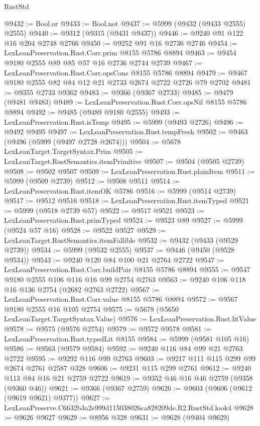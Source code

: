 \begin{lexlean}{RustStd}
\begin{coremodule}
@9432 := Bool.or
@9433 := Bool.not
@9437 := @5999 (@9432 (@9433 @2555) @2555)
@9440 := @9312 (@9315 (@9431 @9437))
@9446 := @9240 @91 @122 @16 @204 @2748 @2766
@9450 := @9252 @91 @16 @2736 @2746
@9454 := LexLeanPreservation.Rust.Corr.prim @8155 @5786 @8894
@9463 := @9454 @9180 @2555 @89 @85 @57 @16 @2736 @2744 @2739
@9467 := LexLeanPreservation.Rust.Corr.opsCons @8155 @5786 @8894
@9479 := @9467 @9180 @2555 @82 @84 @12 @21 @2733 @2674 @2722 @2726 @79 @2702
@9481 := @9355 @2733 @9362
@9483 := @9366 (@9367 @2733)
@9485 := @9479 (@9481 @9483)
@9489 := LexLeanPreservation.Rust.Corr.opsNil @8155 @5786 @8894
@9492 := @9485 (@9489 @9180 @2555)
@9493 := LexLeanPreservation.Rust.isTemp
@9495 := @5999 (@9493 @2726)
@9496 := @9492 @9495
@9497 := LexLeanPreservation.Rust.tempFresh
@9502 := @9463 (@9496 (@5999 (@9497 @2728 @2674)))
@9504 := @5678 LexLeanTarget.TargetSyntax.Prim
@9505 := LexLeanTarget.RustSemantics.itemPrimitive
@9507 := @9504 (@9505 @2739)
@9508 := @9502 @9507
@9509 := LexLeanPreservation.Rust.plainItem
@9511 := @5999 (@9509 @2739)
@9512 := @9508 @9511
@9514 := LexLeanPreservation.Rust.itemOK @5786
@9516 := @5999 (@9514 @2739)
@9517 := @9512 @9516
@9518 := LexLeanPreservation.Rust.itemTyped
@9521 := @5999 (@9518 @2739 @57)
@9522 := @9517 @9521
@9523 := LexLeanPreservation.Rust.primTyped
@9524 := @9523 @89
@9527 := @5999 (@9524 @57 @16)
@9528 := @9522 @9527
@9529 := LexLeanTarget.RustSemantics.itemFallible
@9532 := @9432 (@9433 (@9529 @2739))
@9534 := @5999 (@9532 @2555)
@9537 := @9446 (@9450 (@9528 @9534))
@9543 := @9240 @120 @84 @100 @21 @2764 @2722
@9547 := LexLeanPreservation.Rust.Corr.buildPair @8155 @5786 @8894
@9555 := @9547 @9180 @2555 @106 @116 @16 @99 @2754 @2763
@9563 := @9240 @106 @118 @16 @136 @2754 (@2682 @2763 @2722)
@9567 := LexLeanPreservation.Rust.Corr.value @8155 @5786 @8894
@9572 := @9567 @9180 @2555 @16 @105 @2754
@9575 := @5678 (@5650 LexLeanTarget.TargetSyntax.Value)
@9576 := LexLeanPreservation.Rust.litValue
@9578 := @9575 (@9576 @2754)
@9579 := @9572 @9578
@9581 := LexLeanPreservation.Rust.typedLit @8155
@9584 := @5999 (@9581 @105 @16)
@9586 := @9563 (@9579 @9584)
@9592 := @9240 @116 @84 @99 @21 @2763 @2722
@9595 := @9292 @116 @99 @2763
@9603 := @9217 @111 @115 @299 @99 @2674 @2761 @2587 @328
@9606 := @9231 @115 @299 @2761
@9612 := @9240 @113 @84 @16 @21 @2759 @2722
@9619 := @9352 @46 @16 @46 @2759 (@9358 (@9360 @46))
@9621 := @9366 (@9367 @2759)
@9626 := @9603 (@9606 (@9612 (@9619 @9621) @9377))
@9627 := LexLeanPreserve.C6632b3a2e999d115038026ca828209de.R2.RustStd.look4
@9628 := @9626 @9627
@9629 := @8956 @328
@9631 := @9628 (@9404 @9629)

\end{coremodule}
\end{lexlean}

